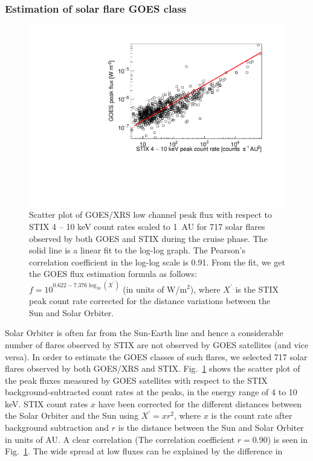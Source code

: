 \documentclass[referee]{aa} %
\providecommand{\DIFaddtex}[1]{{\protect\color{blue}\uwave{#1}}} %
\providecommand{\DIFdeltex}[1]{{\protect\color{red}\sout{#1}}}                      %
\providecommand{\DIFaddFL}[1]{\DIFadd{#1}} %
\providecommand{\DIFdelFL}[1]{\DIFdel{#1}} %
\providecommand{\DIFaddbeginFL}{} %
\providecommand{\DIFaddendFL}{} %
\providecommand{\DIFdelbeginFL}{} %
\providecommand{\DIFdelendFL}{} %
\providecommand{\DIFadd}[1]{\texorpdfstring{\DIFaddtex{#1}}{#1}} %
\providecommand{\DIFdel}[1]{\texorpdfstring{\DIFdeltex{#1}}{}} %
\newcommand{\DIFscaledelfig}{0.5}
\newlength{\DIFdelgraphicswidth} %
\newlength{\DIFdelgraphicsheight} %
\newcommand{\DIFaddincludegraphics}[2][]{{\color{blue}\fbox{\DIFOincludegraphics[#1]{#2}}}} %
\newcommand{\DIFdelincludegraphics}[2][]{%
\sbox{\DIFdelgraphicsbox}{\DIFOincludegraphics[#1]{#2}}%
\settoboxwidth{\DIFdelgraphicswidth}{\DIFdelgraphicsbox} %
\settoboxtotalheight{\DIFdelgraphicsheight}{\DIFdelgraphicsbox} %
\scalebox{\DIFscaledelfig}{%
\parbox[b]{\DIFdelgraphicswidth}{\usebox{\DIFdelgraphicsbox}\\[-\baselineskip] \rule{\DIFdelgraphicswidth}{0em}}\llap{\resizebox{\DIFdelgraphicswidth}{\DIFdelgraphicsheight}{%
\setlength{\unitlength}{\DIFdelgraphicswidth}%
\begin{picture}(1,1)%
\thicklines\linethickness{2pt} %
{\color[rgb]{1,0,0}\put(0,0){\framebox(1,1){}}}%
{\color[rgb]{1,0,0}\put(0,0){\line( 1,1){1}}}%
{\color[rgb]{1,0,0}\put(0,1){\line(1,-1){1}}}%
\end{picture}%
}\hspace*{3pt}}} %
} %
\DeclareRobustCommand{\DIFaddbeginFL}{\DIFOaddbeginFL \let\includegraphics\DIFaddincludegraphics} %
\DeclareRobustCommand{\DIFaddendFL}{\DIFOaddendFL \let\includegraphics\DIFOincludegraphics} %
\DeclareRobustCommand{\DIFdelbeginFL}{\DIFOdelbeginFL \let\includegraphics\DIFdelincludegraphics} %
\DeclareRobustCommand{\DIFdelendFL}{\DIFOaddendFL \let\includegraphics\DIFOincludegraphics} %
\begin{document}
\subsubsection{Estimation of solar flare GOES class }
\begin{figure}
  \centering
  \includegraphics[width=0.8\linewidth]{figures/goes_stix_flux_paper.pdf}
  \caption{Scatter plot of GOES/XRS low channel peak flux with respect to STIX 4 -- 10 keV count rates scaled to 1~AU for 717 solar flares observed by both GOES and STIX during the cruise phase.   The solid line is a linear fit to the log-log graph.  The Pearson’s correlation coefficient  in the log-log scale is 0.91.   From the fit, we get the GOES flux estimation formula as follows: 
\DIFdelbeginFL \DIFdelFL{$f = 10^{0.622 -7.376 \log_{10} (X^{'})}$ }\DIFdelendFL \DIFaddbeginFL \DIFaddFL{$f = 10^{-7.376+0.622 \log_{10} (X^{'})}$ }\DIFaddendFL (in units of W/m$^2$), where $X^{'}$ is the STIX peak count rate corrected for the distance variations between the Sun and Solar Orbiter. 
  }
\label{fig:goes-stix}
\end{figure}
Solar Orbiter is often far from the Sun-Earth line and hence a considerable number of flares observed by STIX 
are not observed by GOES satellites (and vice versa). 
In order to estimate the GOES classes of such flares,  we selected 717 solar flares observed by both GOES/XRS and STIX. 
Fig.~\ref{fig:goes-stix} shows the scatter plot of the peak fluxes
measured by GOES satellites with respect to the STIX background-subtracted count rates at the peaks, 
 in the energy range of 4 to 10 keV. 
STIX count rates $x$ have been corrected for 
the different distances between the Solar Orbiter and the Sun using $X^{'}=x r^2$,
where $x$ is the count rate after background subtraction
 and $r$ is the distance between the Sun and Solar Orbiter in units of AU.  A clear correlation (The correlation coefficient $r=0.90$) is seen in Fig.~\ref{fig:goes-stix}.  The wide spread at low fluxes can be explained by the difference in 
\end{document}
